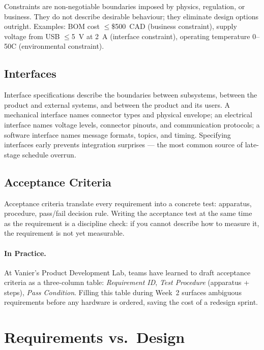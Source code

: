 Constraints are non-negotiable boundaries imposed by physics, regulation, or business.
They do not describe desirable behaviour; they eliminate design options outright.
Examples: BOM cost $\leq$\$500~CAD (business constraint), supply voltage from USB $\leq$5~V at 2~A (interface constraint), operating temperature 0–50\textdegree{}C (environmental constraint).

\subsection{Interfaces}
\label{subsec:ch4-interfaces}

Interface specifications describe the boundaries between subsystems, between the product and external systems, and between the product and its users.
A mechanical interface names connector types and physical envelope; an electrical interface names voltage levels, connector pinouts, and communication protocols; a software interface names message formats, topics, and timing.
Specifying interfaces early prevents integration surprises — the most common source of late-stage schedule overrun.

\subsection{Acceptance Criteria}
\label{subsec:ch4-acceptance}

Acceptance criteria translate every requirement into a concrete test: apparatus, procedure, pass/fail decision rule.
Writing the acceptance test at the same time as the requirement is a discipline check: if you cannot describe how to measure it, the requirement is not yet measurable.

\paragraph{In Practice.}
At Vanier's Product Development Lab, teams have learned to draft acceptance criteria as a three-column table: \emph{Requirement ID}, \emph{Test Procedure} (apparatus + steps), \emph{Pass Condition}.
Filling this table during Week~2 surfaces ambiguous requirements before any hardware is ordered, saving the cost of a redesign sprint.

\section{Requirements vs.\ Design}
\label{sec:ch4-req-vs-design}

